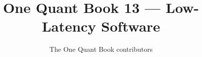 \documentclass[11pt,a4paper,twoside,openany]{book}
\title{One Quant Book 13 --- Low-Latency Software}
\author{The One Quant Book contributors}
\date{\bookdate}
\begin{document}
\frontmatter



\tableofcontents

\mainmatter


\appendix
\part{\omsolutionspart}


\backmatter
\printindex
\end{document}
